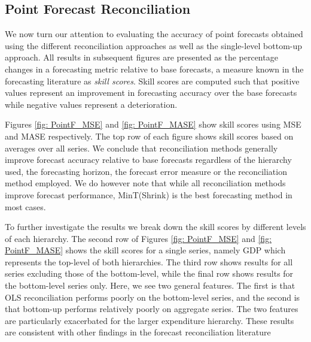 \documentclass[graybox]{svmult}
\begin{document}
\subsection{Point Forecast Reconciliation}

We now turn our attention to evaluating the accuracy of point forecasts obtained using the different reconciliation approaches as well as the single-level bottom-up approach. All results in subsequent figures are presented as the percentage changes in a forecasting metric relative to base forecasts, a measure known in the forecasting literature as {\em skill scores}.  Skill scores are computed such that positive values represent an improvement in forecasting accuracy over the base forecasts while negative values represent a deterioration.

Figures \ref{fig: PointF_MSE} and \ref{fig: PointF_MASE} show skill scores using MSE and MASE respectively. The top row of each figure shows skill scores based on averages over all series.  We conclude that reconciliation methods generally improve forecast accuracy relative to base forecasts regardless of the hierarchy used, the forecasting horizon, the forecast error measure or the reconciliation method employed. We do however note that while all reconciliation methods improve forecast performance, MinT(Shrink) is the best forecasting method in most cases.

To further investigate the results we break down the skill scores by different levels of each hierarchy. The second row of Figures \ref{fig: PointF_MSE} and \ref{fig: PointF_MASE} shows the skill scores for a single series, namely GDP which represents the top-level of both hierarchies.  The third row shows results for all series excluding those of the bottom-level, while the final row shows results for the bottom-level series only. Here, we see two general features. The first is that OLS reconciliation performs poorly on the bottom-level series, and the second is that bottom-up performs relatively poorly on aggregate series.  The two features are particularly exacerbated for the larger expenditure hierarchy. These results are consistent with other findings in the forecast reconciliation literature \citep[see for instance][]{AthEtAl2017,WicEtAl2019}
\end{document}
